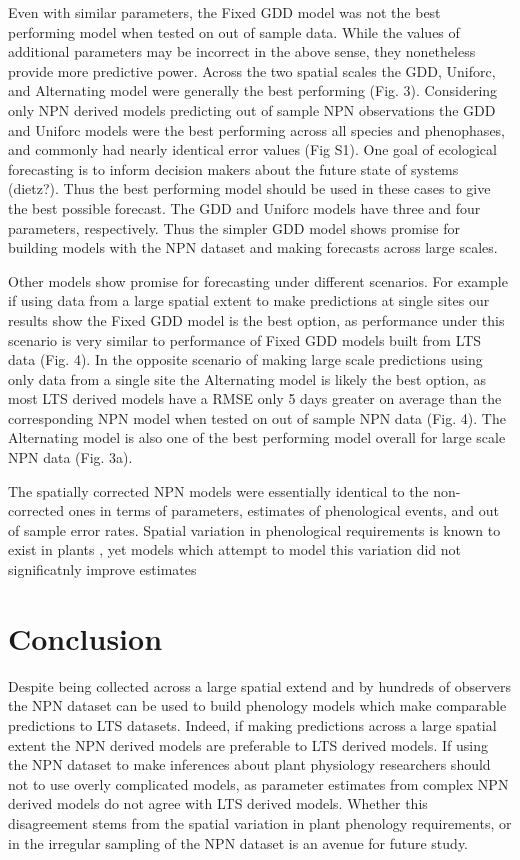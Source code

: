 \documentclass[fleqn,10pt,lineno]{wlpeerj} %
\begin{document}
Even with similar parameters, the Fixed GDD model was not the best performing model when tested on out of sample data. While the values of additional parameters may be incorrect in the above sense, they nonetheless provide more predictive power. Across the two spatial scales the GDD, Uniforc, and Alternating model were generally the best performing (Fig. 3). Considering only NPN derived models predicting out of sample NPN observations the GDD and Uniforc models were the best performing across all species and phenophases, and commonly had nearly identical error values (Fig S1). One goal of ecological forecasting is to inform decision makers about the future state of systems (dietz?). Thus the best performing model should be used in these cases to give the best possible forecast. The GDD and Uniforc models have three and four parameters, respectively. Thus the simpler GDD model shows promise for building models with the NPN dataset and making forecasts across large scales.

Other models show promise for forecasting under different scenarios. For example if using data from a large spatial extent to make predictions at single sites our results show the Fixed GDD model is the best option, as performance under this scenario is very similar to performance of Fixed GDD models built from LTS data (Fig. 4). In the opposite scenario of making large scale predictions using only data from a single site the Alternating model is likely the best option, as most LTS derived models have a RMSE only 5 days greater on average than the corresponding NPN model when tested on out of sample NPN data (Fig. 4). The Alternating model is also one of the best performing model overall for large scale NPN data (Fig. 3a). 

The spatially corrected NPN models were essentially identical to the non-corrected ones in terms of parameters, estimates of phenological events, and out of sample error rates. Spatial variation in phenological requirements is known to exist in plants \citep{zhang2017}, yet models which attempt to model this variation did not significatnly improve estimates 

\section*{Conclusion}
Despite being collected across a large spatial extend and by hundreds of observers the NPN dataset can be used to build phenology models which make comparable predictions to LTS datasets. Indeed, if making predictions across a large spatial extent the NPN derived models are preferable to LTS derived models. If using the NPN dataset to make inferences about plant physiology researchers should not to use overly complicated models, as parameter estimates from complex NPN derived models do not agree with LTS derived models. Whether this disagreement stems from the spatial variation in plant phenology requirements, or in the irregular sampling of the NPN dataset is an avenue for future study. 
\end{document}
